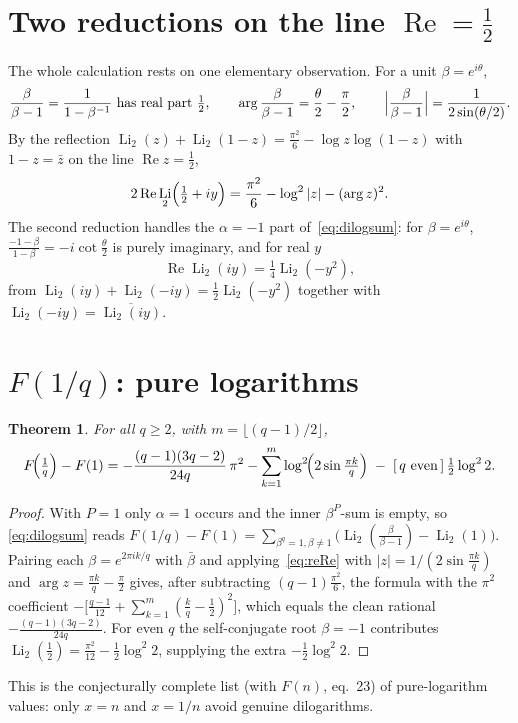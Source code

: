 \documentclass[11pt]{article}
\DeclareMathOperator{\Li}{Li}
\DeclareMathOperator{\Real}{Re}
\theoremstyle{plain}\newtheorem{theorem}{Theorem}\newtheorem{proposition}[theorem]{Proposition}
\theoremstyle{remark}\newtheorem{remark}[theorem]{Remark}
\begin{document}
\section{Two reductions on the line \texorpdfstring{$\Real=\tfrac12$}{Re=1/2}}
The whole calculation rests on one elementary observation. For a unit $\beta=e^{i\theta}$,
\begin{equation}\label{eq:line}
  \frac{\beta}{\beta-1}=\frac{1}{1-\beta^{-1}}\ \text{has real part } \tfrac12,\qquad
  \arg\frac{\beta}{\beta-1}=\frac{\theta}{2}-\frac{\pi}{2},\qquad
  \Bigl|\frac{\beta}{\beta-1}\Bigr|=\frac{1}{2\sin(\theta/2)} .
\end{equation}
By the reflection $\Li_2(z)+\Li_2(1-z)=\tfrac{\pi^2}{6}-\log z\log(1-z)$ with $1-z=\bar z$ on the line
$\Real z=\tfrac12$,
\begin{equation}\label{eq:reRe}
  2\Real\Li_2\Bigl(\tfrac12+iy\Bigr)=\frac{\pi^2}{6}-\log^2|z|-(\arg z)^2 .
\end{equation}
The second reduction handles the $\alpha=-1$ part of~\eqref{eq:dilogsum}: for $\beta=e^{i\theta}$,
$\tfrac{-1-\beta}{1-\beta}=-i\cot\tfrac\theta2$ is purely imaginary, and for real $y$
\begin{equation}\label{eq:imax}
  \Real\Li_2(iy)=\tfrac14\Li_2(-y^2),
\end{equation}
from $\Li_2(iy)+\Li_2(-iy)=\tfrac12\Li_2(-y^2)$ together with $\Li_2(-iy)=\overline{\Li_2(iy)}$.

\section{$F(1/q)$: pure logarithms}
\begin{theorem}\label{thm:F1q}
For all $q\ge2$, with $m=\lfloor(q-1)/2\rfloor$,
\[
  F\!\Bigl(\tfrac1q\Bigr)-F(1)=-\frac{(q-1)(3q-2)}{24q}\,\pi^2
  -\sum_{k=1}^{m}\log^2\!\Bigl(2\sin\tfrac{\pi k}{q}\Bigr)\;-\;[\,q\ \mathrm{even}\,]\,\tfrac12\log^2 2 .
\]
\end{theorem}
\begin{proof}
With $P=1$ only $\alpha=1$ occurs and the inner $\beta^P$-sum is empty, so \eqref{eq:dilogsum} reads
$F(1/q)-F(1)=\sum_{\beta^q=1,\beta\neq1}\bigl(\Li_2(\tfrac{\beta}{\beta-1})-\Li_2(1)\bigr)$. Pairing each
$\beta=e^{2\pi ik/q}$ with $\bar\beta$ and applying~\eqref{eq:reRe} with $|z|=1/(2\sin\frac{\pi k}{q})$ and
$\arg z=\tfrac{\pi k}{q}-\tfrac\pi2$ gives, after subtracting $(q-1)\tfrac{\pi^2}{6}$, the formula with the
$\pi^2$ coefficient $-\bigl[\tfrac{q-1}{12}+\sum_{k=1}^{m}(\tfrac kq-\tfrac12)^2\bigr]$, which equals the
clean rational $-\tfrac{(q-1)(3q-2)}{24q}$. For even $q$ the self-conjugate root $\beta=-1$ contributes
$\Li_2(\tfrac12)=\tfrac{\pi^2}{12}-\tfrac12\log^2 2$, supplying the extra $-\tfrac12\log^2 2$.
\end{proof}
This is the conjecturally complete list (with $F(n)$, eq.~23) of pure-logarithm values: only $x=n$ and
$x=1/n$ avoid genuine dilogarithms.
\end{document}
